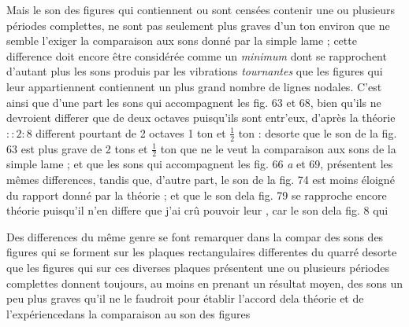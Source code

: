 \documentclass[11pt,a4paper]{article}
\begin{document}
Mais le son des figures qui contiennent ou sont censées contenir une ou
plusieurs périodes complettes, ne sont pas seulement plus graves d'un ton
environ que ne semble l'exiger la comparaison aux sons donné par la
simple lame ; cette difference doit encore être considérée comme un
\emph{minimum} dont se rapprochent d'autant plus les sons produis par les
vibrations \emph{tournantes} que les figures qui leur appartiennent contiennent
un plus grand nombre de lignes nodales. C'est ainsi que d'une part
les sons qui accompagnent les fig. 63 et 68, bien qu'ils ne devroient
differer que de deux octaves puisqu'ils sont entr'eux, d'après la
théorie $::2:8$ different pourtant de 2 octaves 1 ton et $\frac{1}{2}$ ton : desorte que
le son de la fig. 63 est plus grave de 2 tons et $\frac{1}{2}$ ton que ne le
veut la comparaison aux sons de la simple lame ; et que les sons
qui accompagnent les fig. 66 \emph{a} et 69, présentent les mêmes differences,
tandis que, d'autre part, le son de la fig. 74 est moins éloigné du
rapport donné par la théorie ; et que le son dela fig. 79 
se rapproche encore      théorie puisqu'il n'en differe
 que j'ai crû pouvoir leur
, car le son dela fig. 8
qui 

Des differences du même genre se font remarquer dans la compar
des sons des figures qui se forment sur les plaques rectangulaires
differentes du quarré desorte que les figures qui sur ces diverses
plaques présentent une ou plusieurs périodes complettes donnent
toujours, au moins en prenant un résultat moyen, des sons un
peu plus graves qu'il ne le faudroit pour établir l'accord dela
théorie et de l'expériencedans la comparaison au son des figures
\end{document}
